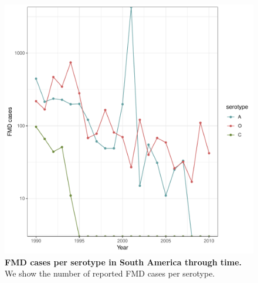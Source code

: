 \documentclass[a4paper,10pt]{article}
\begin{document}
\newpage
\begin{center}
\begin{figure}[H]
\begin{center}
\includegraphics[scale=.600]{FIGURES/PLOTS/cases_per_serotype_per_time.pdf}
\end{center}
\caption{
\textbf{FMD cases per serotype in South America through time.}
We show the number of reported FMD cases per serotype.
}
\label{sfig:case_temporal}
\end{figure}
\end{center}
\newpage
\end{document}
